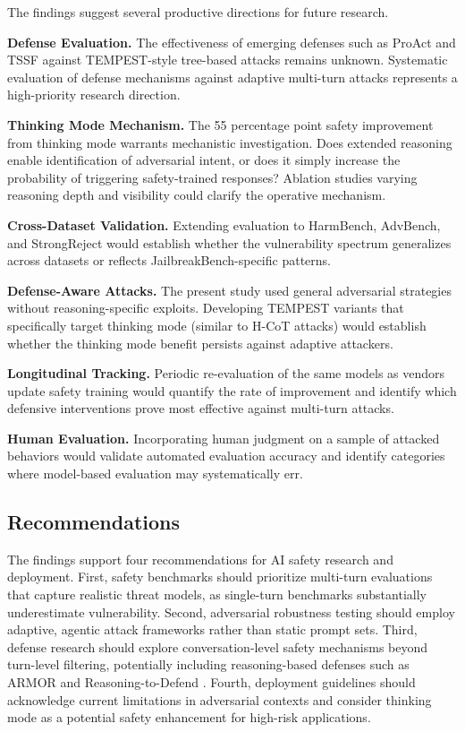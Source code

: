 \documentclass[11pt,a4paper]{article}
\begin{document}
The findings suggest several productive directions for future research.

\textbf{Defense Evaluation.} The effectiveness of emerging defenses such as ProAct \cite{liu2025proact} and TSSF \cite{wang2025tssf} against TEMPEST-style tree-based attacks remains unknown. Systematic evaluation of defense mechanisms against adaptive multi-turn attacks represents a high-priority research direction.

\textbf{Thinking Mode Mechanism.} The 55 percentage point safety improvement from thinking mode warrants mechanistic investigation. Does extended reasoning enable identification of adversarial intent, or does it simply increase the probability of triggering safety-trained responses? Ablation studies varying reasoning depth and visibility could clarify the operative mechanism.

\textbf{Cross-Dataset Validation.} Extending evaluation to HarmBench, AdvBench, and StrongReject would establish whether the vulnerability spectrum generalizes across datasets or reflects JailbreakBench-specific patterns.

\textbf{Defense-Aware Attacks.} The present study used general adversarial strategies without reasoning-specific exploits. Developing TEMPEST variants that specifically target thinking mode (similar to H-CoT attacks) would establish whether the thinking mode benefit persists against adaptive attackers.

\textbf{Longitudinal Tracking.} Periodic re-evaluation of the same models as vendors update safety training would quantify the rate of improvement and identify which defensive interventions prove most effective against multi-turn attacks.

\textbf{Human Evaluation.} Incorporating human judgment on a sample of attacked behaviors would validate automated evaluation accuracy and identify categories where model-based evaluation may systematically err.

\subsection{Recommendations}

The findings support four recommendations for AI safety research and deployment. First, safety benchmarks should prioritize multi-turn evaluations that capture realistic threat models, as single-turn benchmarks substantially underestimate vulnerability. Second, adversarial robustness testing should employ adaptive, agentic attack frameworks rather than static prompt sets. Third, defense research should explore conversation-level safety mechanisms beyond turn-level filtering, potentially including reasoning-based defenses such as ARMOR \cite{xie2025armor} and Reasoning-to-Defend \cite{cao2025r2d}. Fourth, deployment guidelines should acknowledge current limitations in adversarial contexts and consider thinking mode as a potential safety enhancement for high-risk applications.
\end{document}
